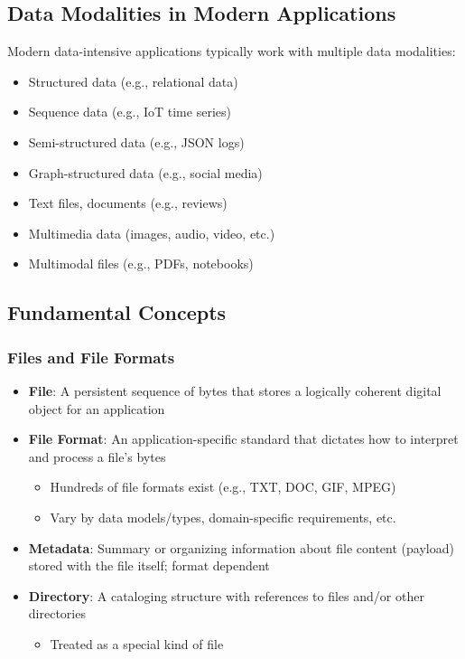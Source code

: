 \documentclass[12pt]{article}
\begin{document}
\subsection{Data Modalities in Modern Applications}

\begin{tcolorbox}[colback=green!5!white,colframe=green!75!black,title={Data Modalities}]
Modern data-intensive applications typically work with multiple data modalities:
\begin{itemize}
    \item Structured data (e.g., relational data)
    \item Sequence data (e.g., IoT time series)
    \item Semi-structured data (e.g., JSON logs)
    \item Graph-structured data (e.g., social media)
    \item Text files, documents (e.g., reviews)
    \item Multimedia data (images, audio, video, etc.)
    \item Multimodal files (e.g., PDFs, notebooks)
\end{itemize}
\end{tcolorbox}

\subsection{Fundamental Concepts}

\subsubsection{Files and File Formats}
\begin{itemize}
    \item \textbf{File}: A persistent sequence of bytes that stores a logically coherent digital object for an application
    \item \textbf{File Format}: An application-specific standard that dictates how to interpret and process a file's bytes
    \begin{itemize}
        \item Hundreds of file formats exist (e.g., TXT, DOC, GIF, MPEG)
        \item Vary by data models/types, domain-specific requirements, etc.
    \end{itemize}
    \item \textbf{Metadata}: Summary or organizing information about file content (payload) stored with the file itself; format dependent
    \item \textbf{Directory}: A cataloging structure with references to files and/or other directories
    \begin{itemize}
        \item Treated as a special kind of file
    \end{itemize}
\end{itemize}
\end{document}
